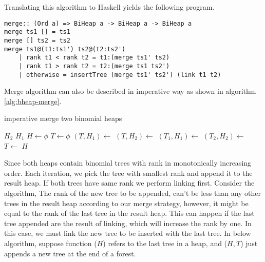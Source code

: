 \documentclass{article}
\begin{document}
Translating this algorithm to Haskell yields the following program.

\lstset{language=Haskell}
\begin{lstlisting}
merge:: (Ord a) => BiHeap a -> BiHeap a -> BiHeap a
merge ts1 [] = ts1
merge [] ts2 = ts2
merge ts1@(t1:ts1') ts2@(t2:ts2') 
    | rank t1 < rank t2 = t1:(merge ts1' ts2)
    | rank t1 > rank t2 = t2:(merge ts1 ts2')
    | otherwise = insertTree (merge ts1' ts2') (link t1 t2)
\end{lstlisting}

Merge algorithm can also be described in imperative way as shown
in algorithm \ref{alg:bheap-merge}.

\begin{algorithm}
\caption{imperative merge two binomial heaps}
\label{alg:bheap-merge}
\begin{algorithmic}[1]
    \State \Return $H_2$
  \EndIf
    \State \Return $H_1$
  \EndIf
  \State $H \gets \phi$
    \State $T \gets \phi$
      \State $(T, H_1) \gets $ 
      \State $(T, H_2) \gets $ 
    \Else {}
      \State $(T_1, H_1) \gets $ 
      \State $(T_2, H_2) \gets $ 
      \State $T \gets $ 
    \EndIf
    \State {}
  \EndWhile
    \State {}
  \EndIf
    \State {}
  \EndIf
  \State \Return $H$
\EndFunction
\end{algorithmic}
\end{algorithm}

Since both heaps contain binomial trees with rank in monotonically 
increasing order. Each iteration, we pick the tree with smallest
rank and append it to the result heap. If both trees have same rank
we perform linking first. Consider the  algorithm,
The rank of the new tree to be appended, can't be less than
any other trees in the result heap according to our merge strategy,
however, it might be equal to the rank of the last tree in the 
result heap. This can happen if the last tree appended are the
result of linking, which will increase the rank by one. In this
case, we must link the new tree to be inserted with the last tree.
In below algorithm, suppose function ($H$) refers 
to the last tree in a heap, and ($H, T$) just 
appends a new tree at the end of a forest. 
\end{document}
